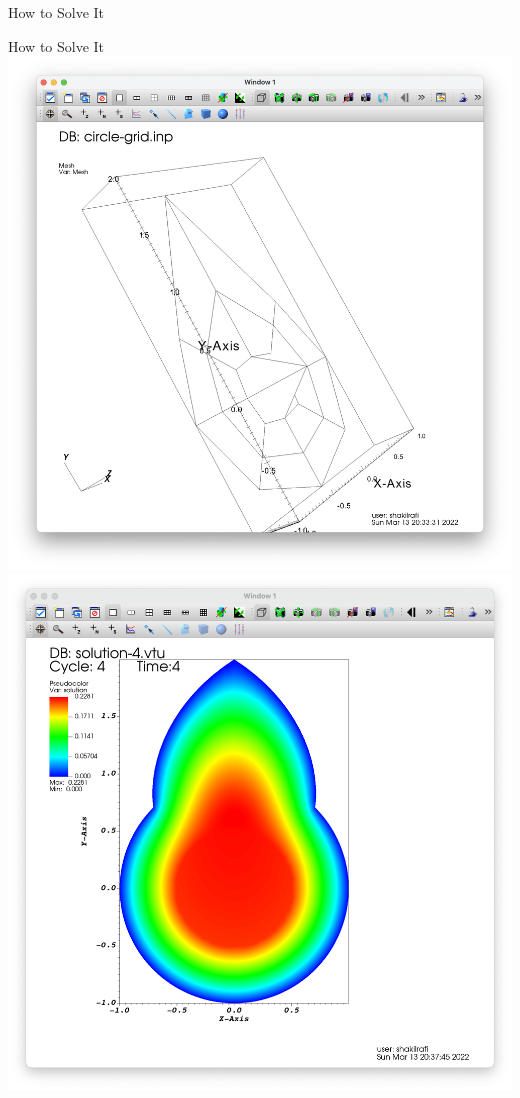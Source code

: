\documentclass{beamer}
\begin{document}
\begin{section}{How to Solve It}
\begin{frame}{How to Solve It}
    \includegraphics[scale = 0.16]{MFDomain.png}
    \includegraphics[scale = 0.16]{MFDomainLE.png}
\end{frame}

\end{section}
\end{document}
